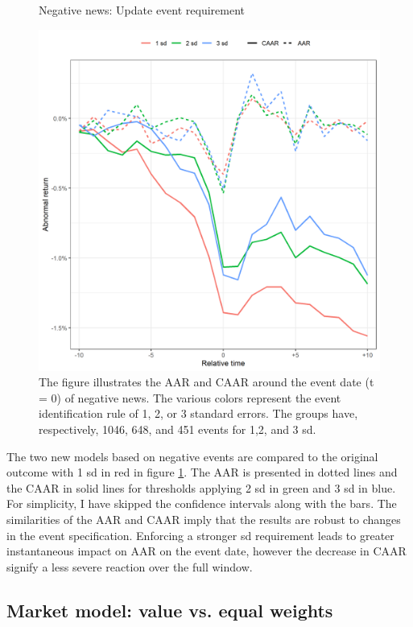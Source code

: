 \begin{figure} [H]
    \centering
    \caption{Negative news: Update event requirement}
    \includegraphics[scale=0.6]{Projekt/1.Figures analysis/ST_negative_sensitivity.png}
     \caption*{\footnotesize The figure illustrates the AAR and CAAR around the event date (t = 0) of negative news. The various colors represent the event identification rule of 1, 2, or 3 standard errors. The groups have, respectively, 1046, 648, and 451 events for 1,2, and 3 sd. }
    \label{fig:ST_neg_sensitivity}
\end{figure} 

The two new models based on negative events are compared to the original outcome with 1 sd in red in figure \ref{fig:ST_neg_sensitivity}. The AAR is presented in dotted lines and the CAAR in solid lines for thresholds applying 2 sd in green and 3 sd in blue. For simplicity, I have skipped the confidence intervals along with the bars. The similarities of the AAR and CAAR imply that the results are robust to changes in the event specification. Enforcing a stronger sd requirement leads to greater instantaneous impact on AAR on the event date, however the decrease in CAAR signify a less severe reaction over the full window. 

\subsection{Market model: value vs. equal weights} \label{sec: sens_st_weights}

